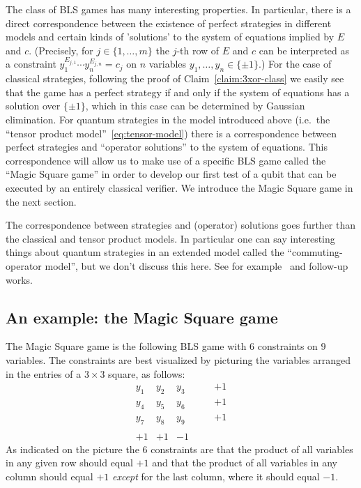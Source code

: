 The class of BLS games has many interesting properties. In particular, there is a  direct correspondence between the existence of perfect strategies in different models and certain kinds of 'solutions' to the system of equations implied by $E$ and $c$. (Precisely, for $j\in \{1,\ldots,m\}$ the $j$-th row of $E$ and $c$ can be interpreted as a constraint $y_1^{E_{j,1}} \cdots y_n^{E_{j,n}} = c_j$ on $n$ variables $y_1,\ldots,y_n \in \{\pm 1\}$.)
For the case of classical strategies, following the proof of Claim~\ref{claim:3xor-class} we easily see that the game has a perfect strategy if and only if the system of equations has a solution over $\{\pm 1\}$, which in this case can be determined by Gaussian elimination. For quantum strategies in the model introduced above (i.e.\ the ``tensor product model''~\eqref{eq:tensor-model}) there is a correspondence between perfect strategies and ``operator solutions'' to the system of equations. This correspondence will allow us to make use of a specific BLS game called the ``Magic Square game'' in order to develop our first test of a qubit that can be executed by an entirely classical verifier. We introduce the Magic Square game in the next section. 

\begin{remark}
The correspondence between strategies and (operator) solutions goes further than the classical and tensor product models. In particular one can say interesting things about quantum strategies in an extended model called the ``commuting-operator model'', but we don't discuss this here. See for example~\cite{cleve2017perfect} and follow-up works. 
\end{remark}

\subsection{An example: the Magic Square game}
\label{subsection-ms-game}

The Magic Square game is the following BLS game with $6$ constraints on $9$ variables. The constraints are best visualized by picturing the variables arranged in the entries of a $3\times 3$ square, as follows: 
\[ \begin{matrix} y_1 & y_2 & y_3 & \quad & +1 \\  y_4 & y_5 & y_6 & \quad & +1 \\  y_7 & y_8 & y_9 & \quad & +1 \\ &&&&\\  +1 & +1 & -1 &  & \end{matrix}\]
As indicated on the picture the $6$ constraints are that the product of all variables in any given row should equal $+1$ and that the product of all variables in any column should equal $+1$ \emph{except} for the last column, where it should equal $-1$. 


